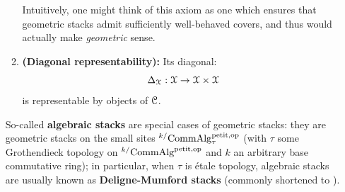 \begin{definition}
\begin{enumerate}
\begin{enumerate}
                                    Intuitively, one might think of this axiom as one which ensures that geometric stacks admit sufficiently well-behaved covers, and thus would actually make \textit{geometric} sense. 
                                    \item \textbf{(Diagonal representability):} Its diagonal:
                                        $$\Delta_{\calX}: \calX \to \calX \x \calX$$
                                    is representable by objects of $\mathcal{C}$. 
                                \end{enumerate}
                            So-called \textbf{algebraic stacks} are special cases of geometric stacks: they are geometric stacks on the small sites ${}^{k/}\mathrm{Comm}\mathrm{Alg}^{\mathrm{petit}, \mathrm{op}}_{\tau}$ (with $\tau$ some Grothendieck topology on ${}^{k/}\mathrm{Comm}\mathrm{Alg}^{\mathrm{petit}, \mathrm{op}}$ and $k$ an arbitrary base commutative ring); in particular, when $\tau$ is \'etale topology, algebraic stacks are usually known as \textbf{Deligne-Mumford stacks} (commonly shortened to ).
                        \end{enumerate}
                    \end{definition}
                    
